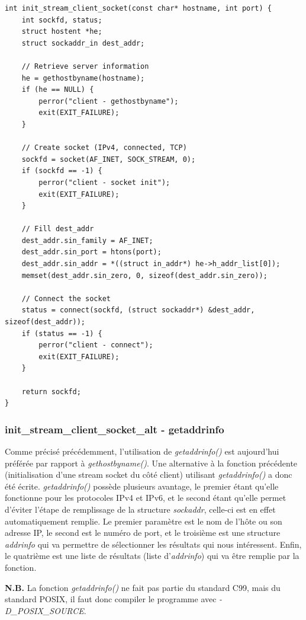 \begin{lstlisting}
int init_stream_client_socket(const char* hostname, int port) {
    int sockfd, status;
    struct hostent *he;
    struct sockaddr_in dest_addr;

    // Retrieve server information
    he = gethostbyname(hostname);
    if (he == NULL) {
        perror("client - gethostbyname");
        exit(EXIT_FAILURE);
    }

    // Create socket (IPv4, connected, TCP)
    sockfd = socket(AF_INET, SOCK_STREAM, 0);
    if (sockfd == -1) {
        perror("client - socket init");
        exit(EXIT_FAILURE);
    }

    // Fill dest_addr
    dest_addr.sin_family = AF_INET;
    dest_addr.sin_port = htons(port);
    dest_addr.sin_addr = *((struct in_addr*) he->h_addr_list[0]);
    memset(dest_addr.sin_zero, 0, sizeof(dest_addr.sin_zero));

    // Connect the socket
    status = connect(sockfd, (struct sockaddr*) &dest_addr, sizeof(dest_addr));
    if (status == -1) {
        perror("client - connect");
        exit(EXIT_FAILURE);
    }

    return sockfd;
}
\end{lstlisting}

\subsubsection{init\_stream\_client\_socket\_alt - getaddrinfo}
Comme précisé précédemment, l'utilisation de \emph{getaddrinfo()} est aujourd'hui préférée par rapport à \emph{gethostbyname()}. Une alternative à la fonction précédente (initialisation d'une stream socket du côté client) utilisant \emph{getaddrinfo()} a donc été écrite. \emph{getaddrinfo()} possède plusieurs avantage, le premier étant qu'elle fonctionne pour les protocoles IPv4 et IPv6, et le second étant qu'elle permet d'éviter l'étape de remplissage de la structure \emph{sockaddr}, celle-ci est en effet automatiquement remplie. Le premier paramètre est le nom de l'hôte ou son adresse IP, le second est le numéro de port, et le troisième est une structure \emph{addrinfo} qui va permettre de sélectionner les résultats qui nous intéressent. Enfin, le quatrième est une liste de résultats (liste d'\emph{addrinfo}) qui va être remplie par la fonction.\\

\begin{mdframed}[backgroundcolor=lightblue, linecolor=darkblue]
\noindent \textbf{N.B.} La fonction \emph{getaddrinfo()} ne fait pas partie du standard C99, mais du standard POSIX, il faut donc compiler le programme avec \emph{-D\_POSIX\_SOURCE}.
\end{mdframed}

